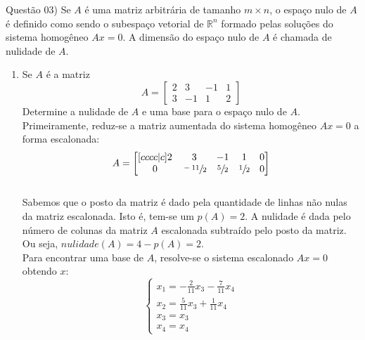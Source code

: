 
\noindent \textcolor{COLOR1}{Questão 03)} Se $A$ é uma matriz arbitrária de tamanho $m\times n$, o espaço nulo de $A$ é definido como sendo o subespaço vetorial de $\mathbb{R}^n$ formado pelas soluções do sistema homogêneo $Ax = 0$. A dimensão do espaço nulo de $A$ é chamada de nulidade de $A.$
\\

\begin{enumerate}
    \item Se $A$ é a matriz
          \[A=
              \begin{bmatrix}
                  2 & 3  & -1 & 1 \\
                  3 & -1 & 1  & 2
              \end{bmatrix}
          \]
          Determine a nulidade de $A$ e uma base para o espaço nulo de $A$.
          \\

          Primeiramente, reduz-se a matriz aumentada do sistema homogêneo $Ax = 0$ a forma escalonada:
          \\

          \[A=
              \begin{bmatrix}[cccc|c]
                  2 & 3              & -1           & 1            & 0 \\
                  0 & \sfrac{-11}{2} & \sfrac{5}{2} & \sfrac{1}{2} & 0
              \end{bmatrix}
          \]
          \\

          Sabemos que o posto da matriz é dado pela quantidade de linhas não nulas da matriz escalonada. Isto é, tem-se um $p(A)=2$. A nulidade é dada pelo número de colunas da matriz $A$ escalonada subtraído pelo posto da matriz. Ou seja, $nulidade(A) = 4 - p(A) = 2$.
          \\

          Para encontrar uma base de $A$, resolve-se o sistema escalonado $A x = 0$ obtendo $x$:
          \\

          \[
              \begin{cases}
                  x_1=-\frac{2}{11}x_3-\frac{7}{11}x_4  \\
                  x_2 = \frac{5}{11}x_3+\frac{1}{11}x_4 \\
                  x_3 = x_3                             \\
                  x_4 = x_4
              \end{cases}
          \]
          \\


\end{enumerate}
